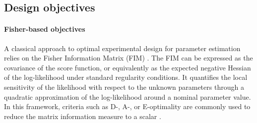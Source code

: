 \documentclass[a4paper,11pt]{article}
\begin{document}
\subsection{Design objectives}

\paragraph{Fisher-based objectives}

A classical approach to optimal experimental design for parameter estimation relies on the Fisher Information Matrix (FIM) \cite{Fisher1922,Atkinson2007}. The FIM can be expressed as the covariance of the score function, or equivalently as the expected negative Hessian of the log-likelihood under standard regularity conditions. It quantifies the local sensitivity of the likelihood with respect to the unknown parameters through a quadratic approximation of the log-likelihood around a nominal parameter value. In this framework, criteria such as D-, A-, or E-optimality are commonly used to reduce the matrix information measure to a scalar \cite{pukelsheim2006optimal}.
\end{document}
